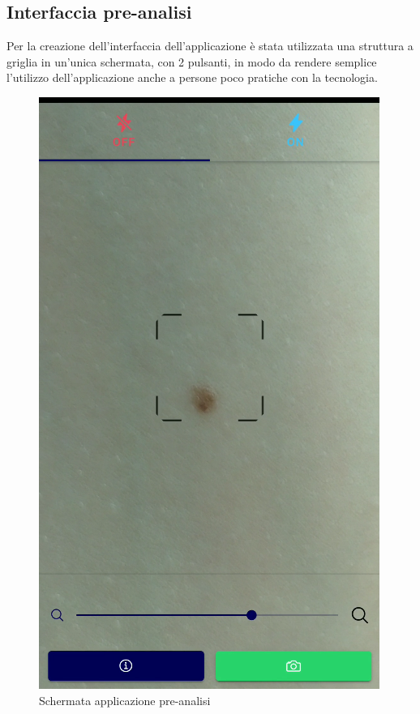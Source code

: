 {\subsection{Interfaccia pre-analisi}
Per la creazione dell'interfaccia dell'applicazione è stata utilizzata una struttura a griglia in un'unica schermata, con 2 pulsanti, in modo da rendere semplice l'utilizzo dell'applicazione anche a persone poco pratiche con la tecnologia.
\newpage
\begin{figure}[h]
	\begin{center}
		\includegraphics[scale=0.7]{figure/capitolo4/interface.png}
	\end{center}
	\caption{Schermata applicazione pre-analisi}
\end{figure}

}

